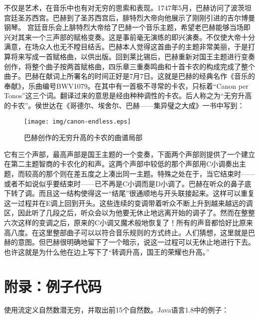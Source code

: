 \documentclass{article}
\begin{document}
不仅是艺术，在音乐中也有对无穷的思索和表现。1747年5月，巴赫访问了波茨坦宫廷圣苏西宫。巴赫到了圣苏西宫后，腓特烈大帝向他展示了刚刚引进的吉尔博曼钢琴。 宫廷音乐会上腓特烈大帝给了巴赫一个音乐主题，希望老巴赫能够当场即兴对其来一个三声部的赋格变奏。这是事前毫无演练的即兴演奏。不仅使大帝十分满意，在场众人也无不瞠目结舌。巴赫本人觉得这首曲子的主题非常美丽，于是打算将来写成一首赋格曲，以供出版。回到莱比锡后，巴赫重新对国王主题进行变奏创作，将整个曲子按两首赋格曲，四乐章三重奏鸣曲和十首卡农的构成完成了整个曲子。巴赫在献词上所署名的时间正好是7月7日。这就是巴赫的经典名作《音乐的奉献》，乐曲编号BWV1079。在其中有一首极不寻常的卡农，只标着“Canon per Tonos”这三个词。翻译过来的意思是经由种种调性的卡农。后人称之为“无穷升高的卡农”。侯世达在《哥德尔、埃舍尔、巴赫——集异璧之大成》一书中写到：

\begin{figure}[htbp]
 \centering
 \texttt{[image: img/canon-endless.eps]}
 \captionsetup{labelformat=empty}
 \caption{巴赫创作的无穷升高的卡农的曲谱局部}
 \label{fig:canon-endless}
\end{figure}

它有三个声部，最高声部是国王主题的一个变奏，下面两个声部则提供了一个建立在第二主题智商的卡农化的和声。这两个声部中较低的那个声部用C小调奏出主题，而较高的那个则在差五度之上凑出同一主题。特殊之处在于，当它结束时——或者不如说似乎要结束时——已不再是C小调而是D小调了。巴赫在听众的鼻子底下转了调。而且这一结构使得这一“结尾”很通顺地与开头联接起来。这样可以重复这一过程并在E调上回到开头。这些连续的变调带着听众不断上升到越来越远的调区，因此听了几段之后，听众会以为他要无休止地远离开始的调子了。然而在整整六次这样的变调之后，原来的C小调又魔术般地恢复了！所有的声音都恰好比原来高八度。在这里整部曲子可以以符合音乐规则的方式终止。人们猜想，这里就是巴赫的意图。但巴赫很明确地留下了一个暗示，说这一过程可以无休止地进行下去。也许这就是为什么他在边上写下了“转调升高，国王的荣耀也升高。”\cite{GEB}

\begin{Exercise}
\end{Exercise}

\section{附录：例子代码}

使用流定义自然数潜无穷，并取出前15个自然数。Java语言1.8中的例子：
\end{document}
